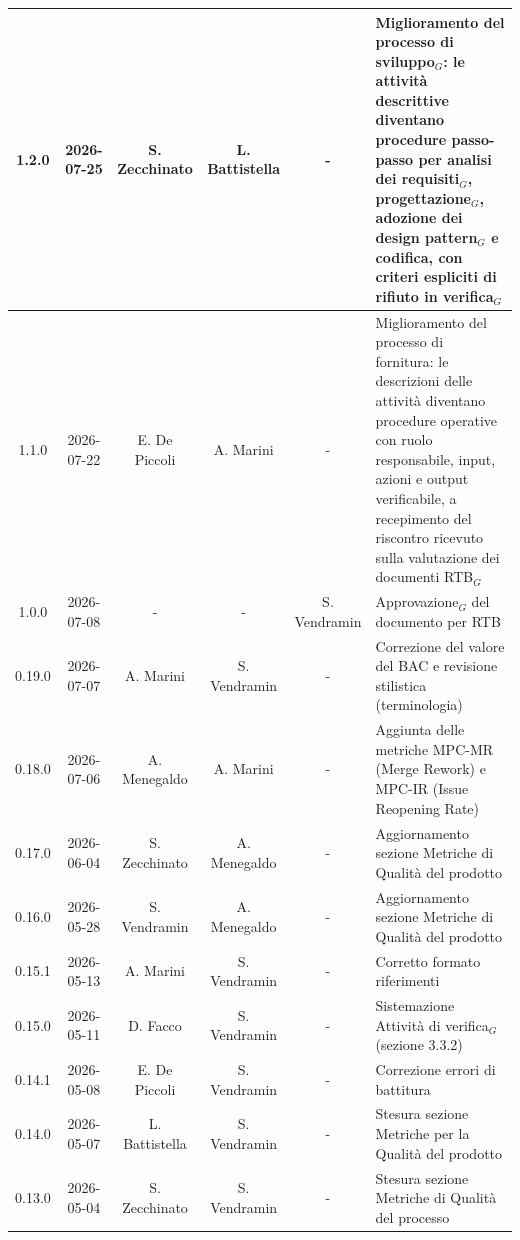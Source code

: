 \documentclass[a4paper, 10pt]{article}
\begin{document}
\begin{longtable}{|c|c|c|c|c|p{3cm}|}
    1.2.0 & 2026-07-25 & S. Zecchinato & L. Battistella & - & Miglioramento del processo di sviluppo$_G$: le attività descrittive diventano procedure passo-passo per analisi dei requisiti$_G$, progettazione$_G$, adozione dei design pattern$_G$ e codifica, con criteri espliciti di rifiuto in verifica$_G$ \\ \hline

    1.1.0 & 2026-07-22 & E. De Piccoli & A. Marini & - & Miglioramento del processo di fornitura: le descrizioni delle attività diventano procedure operative con ruolo responsabile, input, azioni e output verificabile, a recepimento del riscontro ricevuto sulla valutazione dei documenti RTB$_G$ \\ \hline

    1.0.0 & 2026-07-08 & - & - & S. Vendramin & Approvazione$_G$ del documento per RTB \\ \hline

    0.19.0 & 2026-07-07 & A. Marini & S. Vendramin & - & Correzione del valore del BAC e revisione stilistica (terminologia) \\ \hline

    0.18.0 & 2026-07-06 & A. Menegaldo & A. Marini & - & Aggiunta delle metriche MPC-MR (Merge Rework) e MPC-IR (Issue Reopening Rate) \\ \hline

    0.17.0 & 2026-06-04 & S. Zecchinato & A. Menegaldo & - & Aggiornamento sezione Metriche di Qualità del prodotto \\ \hline

    0.16.0 & 2026-05-28 & S. Vendramin & A. Menegaldo & - & Aggiornamento sezione Metriche di Qualità del prodotto \\ \hline

    0.15.1 & 2026-05-13 & A. Marini & S. Vendramin & - & Corretto formato riferimenti \\ \hline

    0.15.0 & 2026-05-11 & D. Facco & S. Vendramin & - & Sistemazione Attività di verifica$_G$ (sezione 3.3.2) \\ \hline

    0.14.1 & 2026-05-08 & E. De Piccoli & S. Vendramin & - & Correzione errori di battitura \\ \hline

    0.14.0 & 2026-05-07 & L. Battistella & S. Vendramin & - & Stesura sezione Metriche per la Qualità del prodotto \\ \hline

    0.13.0 & 2026-05-04 & S. Zecchinato & S. Vendramin & - & Stesura sezione Metriche di Qualità del processo \\ \hline


\end{longtable}
\end{document}
